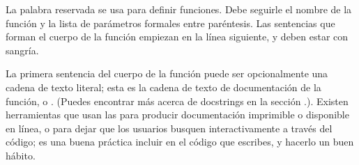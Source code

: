 \documentclass[a5paper,10pt,spanish]{sphinxmanual}
\begin{document}
\begin{sphinxVerbatim}[commandchars=\\\{\}]
     
    
        
       
         
            
    
\end{sphinxVerbatim}

\ignorespaces 
\sphinxAtStartPar
La palabra reservada  se usa para definir funciones. Debe seguirle el nombre de la función y la lista de parámetros formales entre paréntesis. Las sentencias que forman el cuerpo de la función empiezan en la línea siguiente, y deben estar con sangría.

\sphinxAtStartPar
La primera sentencia del cuerpo de la función puede ser opcionalmente una cadena de texto literal; esta es la cadena de texto de documentación de la función, o . (Puedes encontrar más acerca de docstrings en la sección {\hyperref[\detokenize{tutorial/controlflow:tut-docstrings}]{}}.). Existen herramientas que usan las  para producir documentación imprimible o disponible en línea, o para dejar que los usuarios busquen interactivamente a través del código; es una buena práctica incluir  en el código que escribes, y hacerlo un buen hábito.
\end{document}
